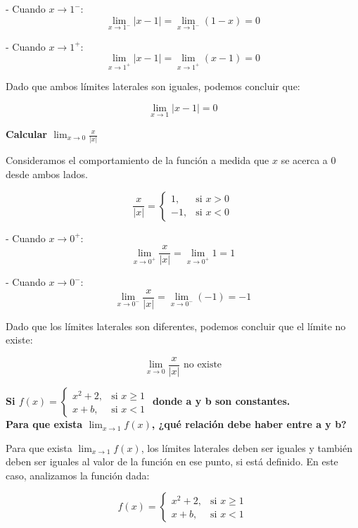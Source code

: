 \documentclass[answers]{exam} %
\begin{document}
\begin{questions}
\begin{solution}
		- Cuando \( x \to 1^- \):
		\[
			\lim_{x \to 1^-} |x-1| = \lim_{x \to 1^-} (1 - x) = 0
		\]

		- Cuando \( x \to 1^+ \):
		\[
			\lim_{x \to 1^+} |x-1| = \lim_{x \to 1^+} (x - 1) = 0
		\]

		Dado que ambos límites laterales son iguales, podemos concluir que:

		\[
			\lim_{x \to 1} |x-1| = 0
		\]
	\end{solution}

	\question \large\textbf{Calcular $\displaystyle \lim_{x\to{0}} \frac{x}{|x|}$}
	\begin{solution}
		Consideramos el comportamiento de la función a medida que \( x \) se acerca a 0 desde ambos lados.

		\[
			\frac{x}{|x|} =
			\begin{cases}
				1,  & \text{si } x > 0 \\
				-1, & \text{si } x < 0
			\end{cases}
		\]

		- Cuando \( x \to 0^+ \):
		\[
			\lim_{x \to 0^+} \frac{x}{|x|} = \lim_{x \to 0^+} 1 = 1
		\]

		- Cuando \( x \to 0^- \):
		\[
			\lim_{x \to 0^-} \frac{x}{|x|} = \lim_{x \to 0^-} (-1) = -1
		\]

		Dado que los límites laterales son diferentes, podemos concluir que el límite no existe:

		\[
			\lim_{x \to 0} \frac{x}{|x|} \text{ no existe}
		\]
	\end{solution}


	\vspace{0.5cm}

	\question \large\textbf{Si $ f(x) =
			\begin{cases}
				x^2+2, & \text{si } x \geq 1 \\
				x+b,   & \text{si } x < 1
			\end{cases}
		$ donde a y b son constantes. \\[1em] Para que exista $\displaystyle \lim_{x\to{1}} f(x)$, ¿qué relación debe haber entre a y b?}
	\newpage
	\begin{solution}
		Para que exista $\displaystyle \lim_{x\to{1}} f(x)$, los límites laterales deben ser iguales y también deben ser iguales al valor de la función en ese punto, si está definido. En este caso, analizamos la función dada:

		\[
			f(x) =
			\begin{cases}
				x^2 + 2, & \text{si } x \geq 1 \\
				x + b,   & \text{si } x < 1
			\end{cases}
		\]


\end{solution}
\end{questions}
\end{document}
